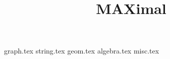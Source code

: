 \documentclass[a4paper]{book}
\title{MAXimal}
\begin{document}
\tableofcontents
{graph.tex}
{string.tex}
{geom.tex}
{algebra.tex}
{misc.tex}
\end{document}
